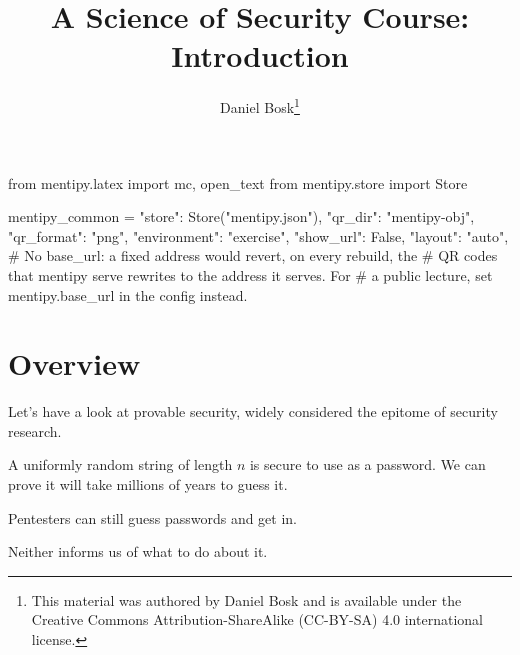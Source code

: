 \title{%
  A Science of Security Course: Introduction
}
\author{Daniel Bosk\thanks{%
    This material was authored by Daniel Bosk and is available under the 
    Creative Commons Attribution-ShareAlike (CC-BY-SA) 4.0 international 
    license.
}}

\begin{pycode}
from mentipy.latex import mc, open_text
from mentipy.store import Store

mentipy_common = {
    "store": Store("mentipy.json"),
    "qr_dir": "mentipy-obj",
    "qr_format": "png",
    "environment": "exercise",
    "show_url": False,
    "layout": "auto",
    # No base_url: a fixed address would revert, on every rebuild, the
    # QR codes that mentipy serve rewrites to the address it serves.  For
    # a public lecture, set mentipy.base_url in the config instead.
}
\end{pycode}
\newcommand{\mentipyqrcaption}[1]{{\tiny\url{#1}}}


\mode*

\begin{abstract}
  
\end{abstract}

\clearpage
\tableofcontents
\clearpage

\section{Overview}

Let's have a look at provable security, widely considered the epitome of 
security research.

\begin{frame}
  \begin{example}\label{SecurePassword}
    A uniformly random string of length \(n\) is secure to use as a password.
    We can prove it will take millions of years to guess it.
  \end{example}

  \pause

  \begin{example}[Pentesting]
    Pentesters can still guess passwords and get in.
  \end{example}

  \pause

  \begin{remark}
    Neither informs us of what to do about it.
  \end{remark}
\end{frame}

